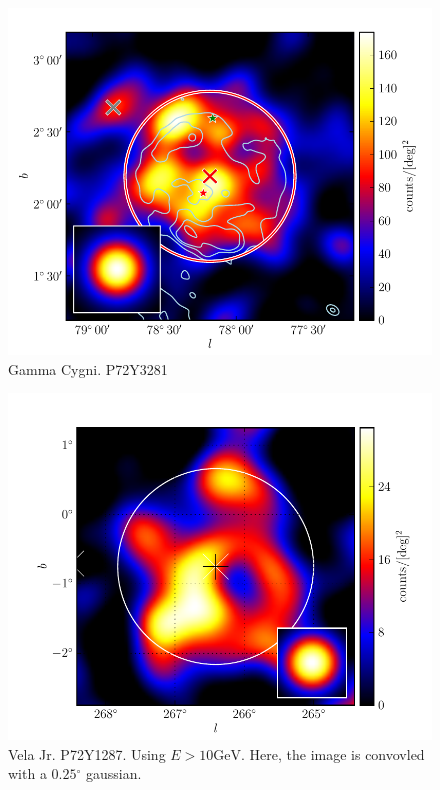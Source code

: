 \documentclass[preprint]{aastex}
\newcommand{\gev}{\text{GeV}\xspace}
\renewcommand{\deg}{\ensuremath{^\circ}\xspace}
\begin{document}
  \begin{figure}
    \begin{center}
      \includegraphics[type=pdf,ext=.pdf,read=.pdf]{source_plots/source_Gamma_Cygni}
    \end{center}
    \caption{
    Gamma Cygni. P72Y3281
    }
  \end{figure}

  \begin{figure}
    \begin{center}
      \includegraphics[type=pdf,ext=.pdf,read=.pdf]{source_plots/source_Vela_Jr}
    \end{center}
    \caption{Vela Jr. P72Y1287. Using $E>10\gev$. Here, the image is
      convovled with a $0.25\deg$ gaussian. }
  \end{figure}
\end{document}
